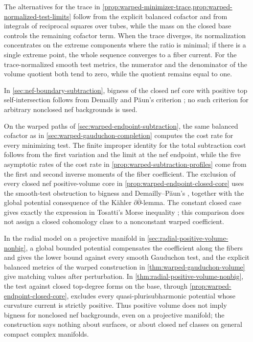 The alternatives for the trace in \cref{prop:warped-minimizer-trace,prop:warped-normalized-test-limits} follow from the explicit balanced cofactor and from integrals of reciprocal squares over tubes, while the mass on the closed base controls the remaining cofactor term. When the trace diverges, its normalization concentrates on the extreme components where the ratio is minimal; if there is a single extreme point, the whole sequence converges to a fiber current. For the trace-normalized smooth test metrics, the numerator and the denominator of the volume quotient both tend to zero, while the quotient remains equal to one.

In \cref{sec:nef-boundary-subtraction}, bigness of the closed nef core with positive top self-intersection follows from Demailly and P{\u a}un's criterion \cite[Theorem~0.5]{DP04}; no such criterion for arbitrary nonclosed nef backgrounds is used.

On the warped paths of \cref{sec:warped-endpoint-subtraction}, the same balanced cofactor as in \cref{sec:warped-gauduchon-completion} computes the cost rate for every minimizing test. The finite improper identity for the total subtraction cost follows from the first variation and the limit at the nef endpoint, while the five asymptotic rates of the cost rate in \cref{prop:warped-subtraction-profiles} come from the first and second inverse moments of the fiber coefficient. The exclusion of every closed nef positive-volume core in \cref{prop:warped-endpoint-closed-core} uses the smooth-test obstruction to bigness and Demailly--P{\u a}un's \cite[Theorem~2.12, pp.~1259--1260]{DP04}, together with the global potential consequence of the K\"ahler $\partial\bar\partial$-lemma. The constant closed case gives exactly the expression in Tosatti's Morse inequality \cite[v2, Theorem~1.1, p.~1]{Tosatti26}; this comparison does not assign a closed cohomology class to a nonconstant warped coefficient.

In the radial model on a projective manifold in \cref{sec:radial-positive-volume-nonbig}, a global bounded potential compensates the coefficient along the fibers and gives the lower bound against every smooth Gauduchon test, and the explicit balanced metrics of the warped construction in \cref{thm:warped-gauduchon-volume} give matching values after perturbation. In \cref{thm:radial-positive-volume-nonbig}, the test against closed top-degree forms on the base, through \cref{prop:warped-endpoint-closed-core}, excludes every quasi-plurisubharmonic potential whose curvature current is strictly positive. Thus positive volume does not imply bigness for nonclosed nef backgrounds, even on a projective manifold; the construction says nothing about surfaces, or about closed nef classes on general compact complex manifolds.

